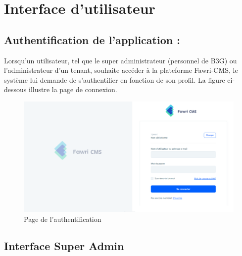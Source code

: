 
\section{Interface d’utilisateur}

\subsection{Authentification de l’application :}

\hspace{\parindent}Lorsqu'un utilisateur, tel que le super administrateur (personnel de B3G) ou l'administrateur d'un tenant, souhaite accéder à la plateforme Fawri-CMS, le système lui demande de s'authentifier en fonction de son profil. La figure ci-dessous illustre la page de connexion.


\begin{figure}[H]
    \centering
    \includegraphics[width=18cm]{Figures/full loging page.PNG}
    \caption{Page de l'authentification}
\end{figure}


\subsection{Interface Super Admin}

